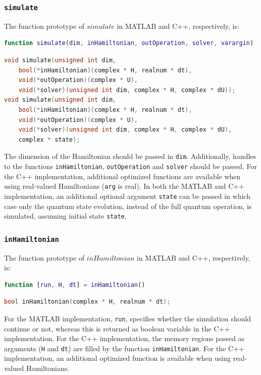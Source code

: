 \documentclass[10pt,a4paper,onecolumn,notitlepage]{article}
\begin{document}
\subsubsection{\lstinline{simulate}}
The function prototype of $\mathit{simulate}$ in MATLAB and C++, respectively, is:
\begin{lstlisting}[language=MATLAB]
function simulate(dim, inHamiltonian, outOperation, solver, varargin)
\end{lstlisting}
\begin{lstlisting}[language=C++]
void simulate(unsigned int dim,
	bool(*inHamiltonian)(complex * H, realnum * dt),
	void(*outOperation)(complex * U),
	void(*solver)(unsigned int dim, complex * H, complex * dU));
void simulate(unsigned int dim,
	bool(*inHamiltonian)(complex * H, realnum * dt),
	void(*outOperation)(complex * U),
	void(*solver)(unsigned int dim, complex * H, complex * dU),
	complex * state);
\end{lstlisting}
The dimension of the Hamiltonian should be passed in \lstinline{dim}. Additionally, handles to the functions \lstinline{inHamiltonian}, \lstinline{outOperation} and \lstinline{solver} should be passed.
For the C++ implementation, additional optimized functions are available when using real-valued Hamiltonians (\lstinline{arg} is real). In both the MATLAB and C++ implementation, an additional optional argument \lstinline{state} can be passed in which case only the quantum state evolution, instead of the full quantum operation, is simulated, assuming initial state \lstinline{state}. 

\subsubsection{\lstinline{inHamiltonian}}
The function prototype of $\mathit{inHamiltonian}$ in MATLAB and C++, respectively, is:
\begin{lstlisting}[language=MATLAB]
function [run, H, dt] = inHamiltonian()
\end{lstlisting}
\begin{lstlisting}[language=C++]
bool inHamiltonian(complex * H, realnum * dt);
\end{lstlisting}
For the MATLAB implementation, \lstinline{run}, specifies whether the simulation should continue or not, whereas this is returned as boolean variable in the C++ implementation.
For the C++ implementation, the memory regions passed as arguments (\lstinline{H} and \lstinline{dt}) are filled by the function \lstinline{inHamiltonian}. For the C++ implementation, an additional optimized function is available when using real-valued Hamiltonians.
\end{document}
